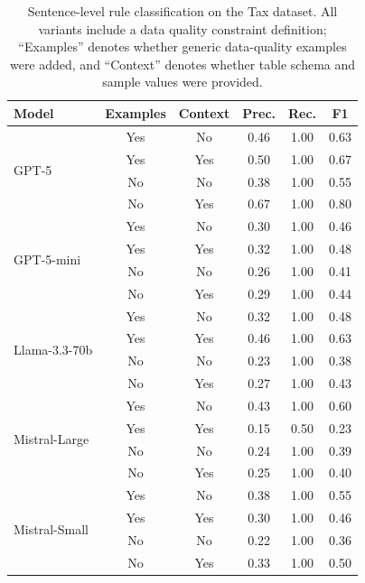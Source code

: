\begin{table}[htbp]
\centering
\small
\caption{Sentence-level rule classification on the Tax dataset. All variants include a data quality constraint definition; ``Examples'' denotes whether generic data-quality examples were added, and ``Context'' denotes whether table schema and sample values were provided.}
\label{tab:classification_results_tax}
\begin{tabular}{@{}lccccc@{}}
\toprule
\textbf{Model} & \textbf{Examples} & \textbf{Context} & \textbf{Prec.} & \textbf{Rec.} & \textbf{F1} \\
\midrule
\multirow{4}{*}{GPT-5} & Yes & No & 0.46 & 1.00 & 0.63 \\
 & Yes & Yes & 0.50 & 1.00 & 0.67 \\
 & No & No & 0.38 & 1.00 & 0.55 \\
 & No & Yes & 0.67 & 1.00 & 0.80 \\
\cmidrule(lr){1-6}
\multirow{4}{*}{GPT-5-mini} & Yes & No & 0.30 & 1.00 & 0.46 \\
 & Yes & Yes & 0.32 & 1.00 & 0.48 \\
 & No & No & 0.26 & 1.00 & 0.41 \\
 & No & Yes & 0.29 & 1.00 & 0.44 \\
\cmidrule(lr){1-6}
\multirow{4}{*}{Llama-3.3-70b} & Yes & No & 0.32 & 1.00 & 0.48 \\
 & Yes & Yes & 0.46 & 1.00 & 0.63 \\
 & No & No & 0.23 & 1.00 & 0.38 \\
 & No & Yes & 0.27 & 1.00 & 0.43 \\
\cmidrule(lr){1-6}
\multirow{4}{*}{Mistral-Large} & Yes & No & 0.43 & 1.00 & 0.60 \\
 & Yes & Yes & 0.15 & 0.50 & 0.23 \\
 & No & No & 0.24 & 1.00 & 0.39 \\
 & No & Yes & 0.25 & 1.00 & 0.40 \\
\cmidrule(lr){1-6}
\multirow{4}{*}{Mistral-Small} & Yes & No & 0.38 & 1.00 & 0.55 \\
 & Yes & Yes & 0.30 & 1.00 & 0.46 \\
 & No & No & 0.22 & 1.00 & 0.36 \\
 & No & Yes & 0.33 & 1.00 & 0.50 \\
\bottomrule
\end{tabular}
\end{table}